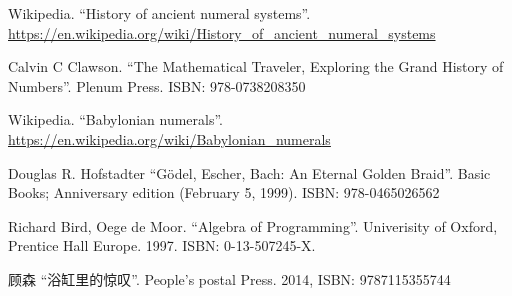 \documentclass[UTF8]{article}
\begin{document}
\ifx\wholebook\relax \else
\begin{thebibliography}{99}

Wikipedia. ``History of ancient numeral systems''. \url{https://en.wikipedia.org/wiki/History_of_ancient_numeral_systems}

Calvin C Clawson. ``The Mathematical Traveler, Exploring the Grand History of Numbers''. Plenum Press. ISBN: 978-0738208350

Wikipedia. ``Babylonian numerals''. \url{https://en.wikipedia.org/wiki/Babylonian_numerals}

Douglas R. Hofstadter ``Gödel, Escher, Bach: An Eternal Golden Braid''. Basic Books; Anniversary edition (February 5, 1999). ISBN: 978-0465026562

Richard Bird, Oege de Moor. ``Algebra of Programming''. Univerisity of Oxford, Prentice Hall Europe. 1997. ISBN: 0-13-507245-X.

顾森 ``浴缸里的惊叹''. People's postal Press. 2014, ISBN: 9787115355744

\end{thebibliography}

\expandafter\enddocument

\fi
\end{document}
